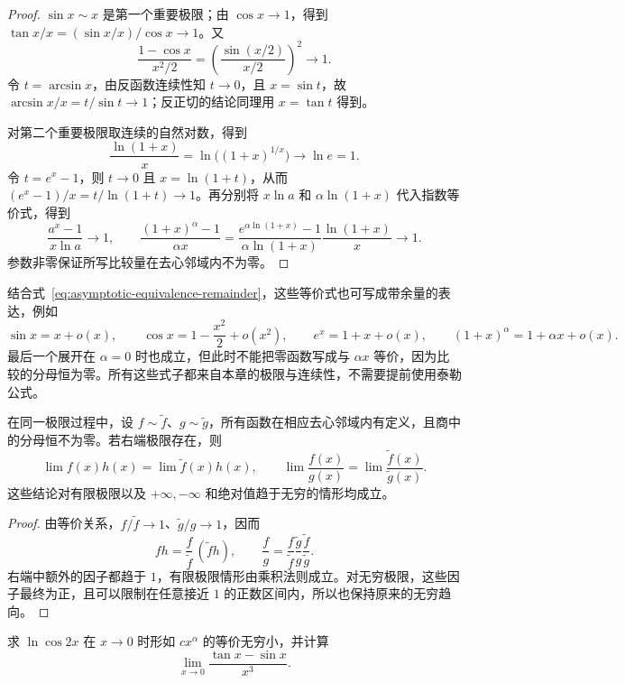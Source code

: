\documentclass[UTF8,12pt,a4paper,fontset=fandol]{ctexbook}
\begin{document}
\begin{proof}
$\sin x\sim x$ 是第一个重要极限；由 $\cos x\to1$，得到 $\tan x/x=(\sin x/x)/\cos x\to1$。又
\[
    \frac{1-\cos x}{x^2/2}
    =\left(\frac{\sin(x/2)}{x/2}\right)^2\to1.
\]
令 $t=\arcsin x$，由反函数连续性知 $t\to0$，且 $x=\sin t$，故 $\arcsin x/x=t/\sin t\to1$；反正切的结论同理用 $x=\tan t$ 得到。

对第二个重要极限取连续的自然对数，得到
\[
    \frac{\ln(1+x)}x
    =\ln\bigl((1+x)^{1/x}\bigr)\to\ln e=1.
\]
令 $t=e^x-1$，则 $t\to0$ 且 $x=\ln(1+t)$，从而 $(e^x-1)/x=t/\ln(1+t)\to1$。再分别将 $x\ln a$ 和 $\alpha\ln(1+x)$ 代入指数等价式，得到
\[
    \frac{a^x-1}{x\ln a}\to1,
    \qquad
    \frac{(1+x)^\alpha-1}{\alpha x}
    =\frac{e^{\alpha\ln(1+x)}-1}{\alpha\ln(1+x)}
      \frac{\ln(1+x)}x\to1.
\]
参数非零保证所写比较量在去心邻域内不为零。
\end{proof}

结合式~\eqref{eq:asymptotic-equivalence-remainder}，这些等价式也可写成带余量的表达，例如
\[
    \sin x=x+o(x),\qquad
    \cos x=1-\frac{x^2}{2}+o(x^2),\qquad
    e^x=1+x+o(x),\qquad
    (1+x)^\alpha=1+\alpha x+o(x).
\]
最后一个展开在 $\alpha=0$ 时也成立，但此时不能把零函数写成与 $\alpha x$ 等价，因为比较的分母恒为零。所有这些式子都来自本章的极限与连续性，不需要提前使用泰勒公式。

\begin{theorem}[等价因子的替换]
\label{thm:replacement-of-equivalent-factors}
在同一极限过程中，设 $f\sim\widetilde f$、$g\sim\widetilde g$，所有函数在相应去心邻域内有定义，且商中的分母恒不为零。若右端极限存在，则
\begin{equation}
    \lim f(x)h(x)=\lim\widetilde f(x)h(x),
    \qquad
    \lim\frac{f(x)}{g(x)}=\lim\frac{\widetilde f(x)}{\widetilde g(x)}.
    \label{eq:replacement-of-equivalent-factors}
\end{equation}
这些结论对有限极限以及 $+\infty,-\infty$ 和绝对值趋于无穷的情形均成立。
\end{theorem}

\begin{proof}
由等价关系，$f/\widetilde f\to1$、$\widetilde g/g\to1$，因而
\[
    fh=\frac f{\widetilde f}\,(\widetilde f h),
    \qquad
    \frac fg=\frac f{\widetilde f}\frac{\widetilde g}g
        \frac{\widetilde f}{\widetilde g}.
\]
右端中额外的因子都趋于 $1$，有限极限情形由乘积法则成立。对无穷极限，这些因子最终为正，且可以限制在任意接近 $1$ 的正数区间内，所以也保持原来的无穷趋向。
\end{proof}

\begin{example}
\label{ex:equivalent-infinitesimal-calculations}
求 $\ln\cos2x$ 在 $x\to0$ 时形如 $cx^\alpha$ 的等价无穷小，并计算
\[
    \lim_{x\to0}\frac{\tan x-\sin x}{x^3}.
\]
\end{example}
\end{document}
